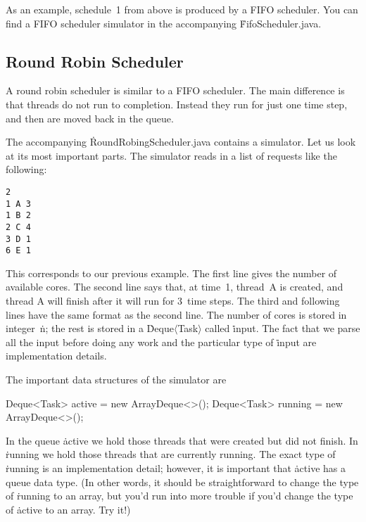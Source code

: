 As an example, schedule~1 from above is produced by a FIFO scheduler.
You can find a FIFO scheduler simulator in the accompanying \.{FifoScheduler.java}.


\subsection{Round Robin Scheduler}

A round robin scheduler is similar to a FIFO scheduler.
The main difference is that threads do not run to completion.
Instead they run for just one time step, and then are moved back in the queue.

The accompanying \.{RoundRobingScheduler.java} contains a simulator.
Let us look at its most important parts.
The simulator reads in a list of requests like the following:
\begin{verbatim}
2
1 A 3
1 B 2
2 C 4
3 D 1
6 E 1
\end{verbatim}
This corresponds to our previous example.
The first line gives the number of available cores.
The second line says that, at time~1, thread~A is created,
  and thread A will finish after it will run for 3~time steps.
The third and following lines have the same format as the second line.
The number of cores is stored in integer~\.{n};
  the rest is stored in a \.{Deque$\langle$Task$\rangle$} called \.{input}.
The fact that we parse all the input before doing any work
  and the particular type of \.{input} are implementation details.

The important data structures of the simulator are
\begin{ccode}
Deque<Task> active = new ArrayDeque<>();
Deque<Task> running = new ArrayDeque<>();
\end{ccode}
In the queue \.{active} we hold those threads that were created but did not finish.
In \.{running} we hold those threads that are currently running.
The exact type of \.{running} is an implementation detail;
  however, it is important that \.{active} has a queue data type.
(In other words,
  it should be straightforward to change the type of \.{running} to an array,
  but you'd run into more trouble if you'd change the type of \.{active} to an array.
Try it!)

